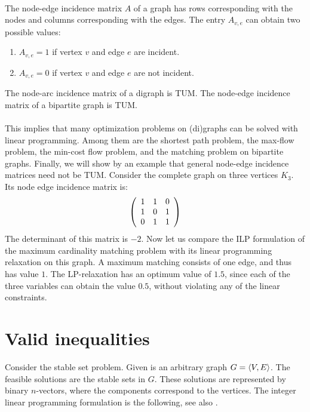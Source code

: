 \paragraph{}
The node-edge incidence matrix $A$ of a graph has rows corresponding with the nodes and columns corresponding with the edges. The entry $A_{v,e}$ can obtain two possible values:
\begin{enumerate}
 \item $A_{v,e}=1$ if vertex $v$ and edge $e$ are incident.
 \item $A_{v,e}=0$ if vertex $v$ and edge $e$ are not incident.
\end{enumerate}

\begin{corollary}
The node-arc incidence matrix of a digraph is TUM. The node-edge incidence matrix of a bipartite graph is TUM.
\end{corollary}

\paragraph{}
This implies that many optimization problems on (di)graphs can be solved with linear programming. Among them are the shortest path problem, the max-flow problem, the min-cost flow problem, and the matching problem on bipartite graphs. Finally, we will show by an example that general node-edge incidence matrices need not be TUM. Consider the complete graph on three vertices $K_3$. Its node edge
incidence matrix is:
\begin{equation}
\left( \begin{array}{ccc}
1&1&0\\
1&0&1\\
0&1&1
\end{array} \right)
\end{equation}
The determinant of this matrix is $-2$. Now let us compare the ILP formulation of the maximum cardinality matching problem with its linear programming relaxation on this graph. A maximum matching consists of one edge, and thus has value $1$. The LP-relaxation has an optimum value of $1.5$, since each of the three variables can obtain the value $0.5$, without violating any of the linear constraints.

\section{Valid inequalities}
Consider the stable set problem. Given is an arbitrary graph $G=\left\langle V,E \right\rangle$. The feasible solutions are the stable sets in $G$. These solutions are represented by binary $n$-vectors, where the components correspond to the vertices. The integer linear programming formulation is the following, see also .

